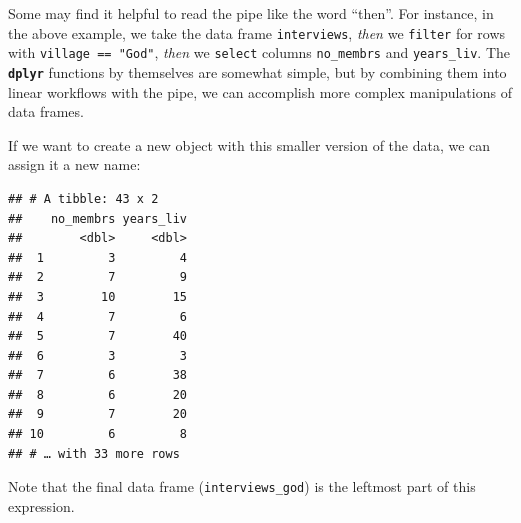 \documentclass[]{book}
\newenvironment{Shaded}{\begin{snugshade}}{\end{snugshade}}
\newcommand{\KeywordTok}[1]{\textcolor[rgb]{0.13,0.29,0.53}{\textbf{#1}}}
\newcommand{\StringTok}[1]{\textcolor[rgb]{0.31,0.60,0.02}{#1}}
\newcommand{\OperatorTok}[1]{\textcolor[rgb]{0.81,0.36,0.00}{\textbf{#1}}}
\newcommand{\NormalTok}[1]{#1}
\begin{document}
Some may find it helpful to read the pipe like the word ``then''. For
instance, in the above example, we take the data frame
\texttt{interviews}, \emph{then} we \texttt{filter} for rows with
\texttt{village\ ==\ "God"}, \emph{then} we \texttt{select} columns
\texttt{no\_membrs} and \texttt{years\_liv}. The \textbf{\texttt{dplyr}}
functions by themselves are somewhat simple, but by combining them into
linear workflows with the pipe, we can accomplish more complex
manipulations of data frames.

If we want to create a new object with this smaller version of the data,
we can assign it a new name:

\begin{Shaded}
\end{Shaded}

\begin{verbatim}
## # A tibble: 43 x 2
##    no_membrs years_liv
##        <dbl>     <dbl>
##  1         3         4
##  2         7         9
##  3        10        15
##  4         7         6
##  5         7        40
##  6         3         3
##  7         6        38
##  8         6        20
##  9         7        20
## 10         6         8
## # … with 33 more rows
\end{verbatim}

Note that the final data frame (\texttt{interviews\_god}) is the
leftmost part of this expression.
\end{document}
